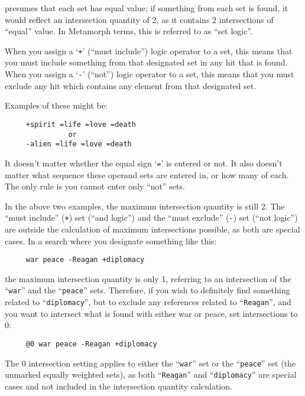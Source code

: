 presumes that each set has equal value; if something from each set is
found, it would reflect an intersection quantity of 2, as it contains
2 intersections of ``equal'' value.  In Metamorph terms, this is
referred to as ``set logic''.

When you assign a `\verb`+`' (``must include'') logic operator to a
set, this means that you must include something from that designated
set in any hit that is found.  When you assign a `\verb`-`' (``not'')
logic operator to a set, this means that you must exclude any hit
which contains any element from that designated set.

Examples of these might be:

\begin{verbatim}
     +spirit =life =love =death
               or
     -alien =life =love =death
\end{verbatim}

It doesn't matter whether the equal sign `\verb`=`' is entered or not.
It also doesn't matter what sequence these operand sets are entered
in, or how many of each.  The only rule is you cannot enter only
``not'' sets.

In the above two examples, the maximum intersection quantity is still
2. The ``must include'' (\verb`+`) set (``and logic'') and the ``must
exclude'' (\verb`-`) set (``not logic'') are outside the calculation
of maximum intersections possible, as both are special cases.  In a
search where you designate something like this:

\begin{verbatim}
     war peace -Reagan +diplomacy
\end{verbatim}

the maximum intersection quantity is only 1, referring to an
intersection of the ``\verb`war`'' and the ``\verb`peace`'' sets.
Therefore, if you wish to definitely find something related to
``\verb`diplomacy`'', but to exclude any references related to
``\verb`Reagan`'', and you want to intersect what is found with either
war or peace, set intersections to 0:

\begin{verbatim}
     @0 war peace -Reagan +diplomacy
\end{verbatim}

The 0 intersection setting applies to either the ``\verb`war`'' set or
the ``\verb`peace`'' set (the unmarked equally weighted sets), as both
``\verb`Reagan`'' and ``\verb`diplomacy`'' are special cases and not
included in the intersection quantity calculation.


